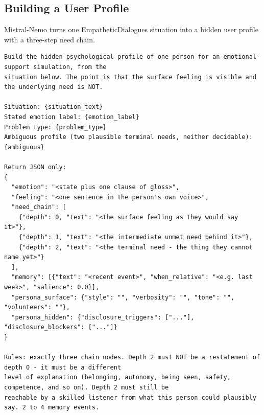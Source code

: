 \documentclass[journal]{IEEEtran}
\begin{document}
\subsection{Building a User Profile}
Mistral-Nemo turns one EmpatheticDialogues situation into a hidden user profile with a three-step need chain.
\begin{lstlisting}
Build the hidden psychological profile of one person for an emotional-support simulation, from the
situation below. The point is that the surface feeling is visible and the underlying need is NOT.

Situation: {situation_text}
Stated emotion label: {emotion_label}
Problem type: {problem_type}
Ambiguous profile (two plausible terminal needs, neither decidable): {ambiguous}

Return JSON only:
{
  "emotion": "<state plus one clause of gloss>",
  "feeling": "<one sentence in the person's own voice>",
  "need_chain": [
    {"depth": 0, "text": "<the surface feeling as they would say it>"},
    {"depth": 1, "text": "<the intermediate unmet need behind it>"},
    {"depth": 2, "text": "<the terminal need - the thing they cannot name yet>"}
  ],
  "memory": [{"text": "<recent event>", "when_relative": "<e.g. last week>", "salience": 0.0}],
  "persona_surface": {"style": "", "verbosity": "", "tone": "", "volunteers": ""},
  "persona_hidden": {"disclosure_triggers": ["..."], "disclosure_blockers": ["..."]}
}

Rules: exactly three chain nodes. Depth 2 must NOT be a restatement of depth 0 - it must be a different
level of explanation (belonging, autonomy, being seen, safety, competence, and so on). Depth 2 must still be
reachable by a skilled listener from what this person could plausibly say. 2 to 4 memory events.
\end{lstlisting}
\end{document}
